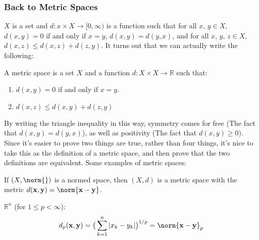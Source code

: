 \documentclass[crop=false,class=article,oneside]{standalone}
\begin{document}
        \subsubsection{Back to Metric Spaces}
            $X$ is a set and
            $d:{x}\times{X}\rightarrow[0,\infty)$
            is a function such that for all $x$, $y\in{X}$,
            $d(x,y)=0$ if and only if $x=y$,
            $d(x,y)=d(y,x)$, and for all
            $x$, $y$, $z\in{X}$,
            $d(x,z)\leq{d(x,z)+d(z,y)}$. It turns out
            that we can actually write the following:
            \begin{definition}
                A metric space is a set $X$ and a function
                $d:{X}\times{X}\rightarrow\mathbb{R}$
                such that:
                \begin{enumerate}
                    \item $d(x,y)=0$ if and only if
                          $x=y$.
                    \item $d(x,z)\leq{d(x,y)+d(z,y)}$
                \end{enumerate}
            \end{definition}
            By writing the triangle inequality in this
            way, symmetry comes for free
            (The fact that $d(x,y)=d(y,x)$), as well
            as positivity (The fact that $d(x,y)\geq{0}$).
            Since it's easier to prove two things are
            true, rather than four things, it's nice to
            take this as the definition of a metric space,
            and then prove that the two definitions are
            equivalent. Some examples of metric spaces:
            \begin{example}
                If $(X,\norm{})$ is a normed space,
                then $(X,d)$ is a metric space with
                the metric
                $d(\mathbf{x},\mathbf{y})%
                 =\norm{\mathbf{x}-\mathbf{y}}$.
            \end{example}
            \begin{example}
                $\mathbb{R}^{n}$ (for $1\leq{p}<\infty$):
                \begin{equation*}
                    d_{p}(\mathbf{x},\mathbf{y})=
                    \big(
                        \sum_{k=1}^{n}|x_{k}-y_{k}|
                    \big)^{1/p}
                    =\norm{\mathbf{x}-\mathbf{y}}_{p}
                \end{equation*}
            \end{example}
\end{document}
